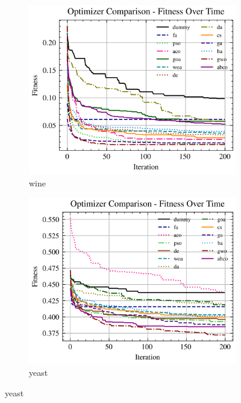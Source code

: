\begin{figure}[htp]
    \begin{subfigure}[htp]{0.45\textwidth}
        \includegraphics[width=\textwidth]{imagenes/fitness_charts/img/binary/wine/optimizers_fitness_knn.png}
        \caption{wine}
        \label{fig:convergencia_wine_knn}
    \end{subfigure}
    \begin{subfigure}[htp]{0.45\textwidth}
        \includegraphics[width=\textwidth]{imagenes/fitness_charts/img/binary/yeast/optimizers_fitness_knn.png}
        \caption{yeast}
        \label{fig:convergencia_yeast_knn}
    \end{subfigure}


\end{figure}
